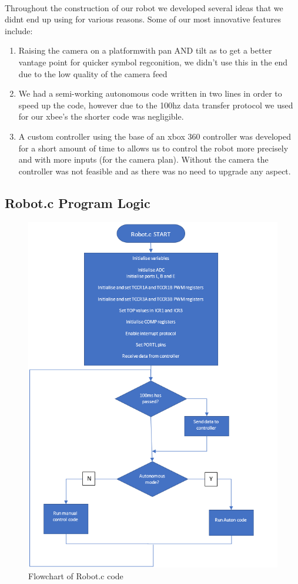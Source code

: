 \documentclass[12pt, a4paper]{article}
\begin{document}
        \paragraph{}
          Throughout the construction of our robot we developed several ideas that we didnt end up using for various reasons. 
          Some of our most innovative features include:
          \begin{enumerate}
            \item Raising the camera on a platformwith pan AND tilt as to get a better vantage point for quicker symbol regconition, we didn't use this in the end due to the low quality of the camera feed
            \item We had a semi-working autonomous code written in two lines in order to speed up the code, however due to the 100hz data transfer protocol we used for our xbee's the shorter code was negligible.
            \item A custom controller using the base of an xbox 360 controller was developed for a short amount of time to allows us to control the robot more precisely and with more inputs (for the camera plan). Without the camera the controller was not feasible and as there was no need to upgrade any aspect.
          \end{enumerate}
    \newpage
      \subsection{Robot.c Program Logic}
        \begin{figure}[h]
          \includegraphics[width=0.6\columnwidth]{Images/robot_c.png}
          \centering
          \caption{Flowchart of Robot.c code}
          \label{fig:Flowchart:robot_c}
        \end{figure}
  
\end{document}

